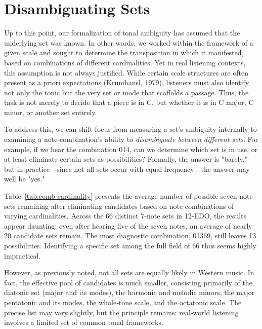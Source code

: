 \documentclass[10pt,twocolumn]{article}
\numberwithin{equation}{section} %
\begin{document}
    \section{Disambiguating Sets}

    Up to this point, our formalization of tonal ambiguity has assumed that the underlying set was known.
    In other words, we worked within the framework of a given scale and sought to determine the transposition in which it manifested, based on combinations of different cardinalities.
    Yet in real listening contexts, this assumption is not always justified.
    While certain scale structures are often present as a priori expectations (Krumhansl, 1979), listeners must also identify not only the tonic but the very set or mode that scaffolds a passage.
    Thus, the task is not merely to decide that a piece is in C, but whether it is in C major, C minor, or another set entirely.

    To address this, we can shift focus from measuring a set's ambiguity internally to examining a note‑combination's ability to \textit{disambiguate between different sets}.
    For example, if we hear the combination 014, can we determine which set is in use, or at least eliminate certain sets as possibilities?
    Formally, the answer is "barely," but in practice—since not all sets occur with equal frequency—the answer may well be "yes."

    Table~\ref{tab:comb-cardinality} presents the average number of possible seven‑note sets remaining after eliminating candidates based on note combinations of varying cardinalities.
    Across the 66 distinct 7‑note sets in 12‑EDO, the results appear daunting: even after hearing five of the seven notes, an average of nearly 20 candidate sets remain.
    The most diagnostic combination, 01369, still leaves 13 possibilities.
    Identifying a specific set among the full field of 66 thus seems highly impractical.

    

    However, as previously noted, not all sets are equally likely in Western music.
    In fact, the effective pool of candidates is much smaller, consisting primarily of the diatonic set (major and its modes), the harmonic and melodic minors, the major pentatonic and its modes, the whole‑tone scale, and the octatonic scale.
    The precise list may vary slightly, but the principle remains: real‑world listening involves a limited set of common tonal frameworks.
\end{document}
